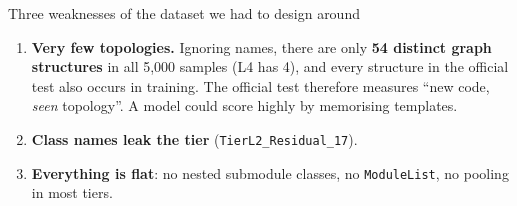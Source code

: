 \documentclass[11pt,a4paper]{article}
\begin{document}
\begin{warnbox}{Three weaknesses of the dataset we had to design around}
\begin{enumerate}[leftmargin=*]
\item \textbf{Very few topologies.} Ignoring names, there are only \textbf{54 distinct graph structures} in all 5{,}000
samples (L4 has 4), and every structure in the official test also occurs in training. The official test therefore
measures ``new code, \emph{seen} topology''. A model could score highly by memorising templates.
\item \textbf{Class names leak the tier} (\texttt{TierL2\_Residual\_17}).
\item \textbf{Everything is flat}: no nested submodule classes, no \texttt{ModuleList}, no pooling in most tiers.
\end{enumerate}
\end{warnbox}
\end{document}
